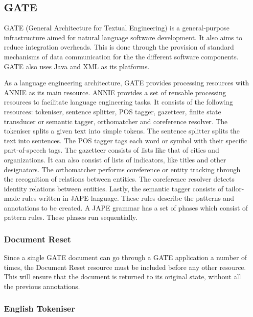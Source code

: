 \subsection{GATE}
\label{sec:gate}

GATE (General Architecture for Textual Engineering) is a general-purpose infrastructure aimed for natural language software development. It also aims to reduce integration overheads. This is done through the provision of standard mechanisms of data communication for the the different software components. GATE also uses Java and XML as its platforms. 

As a language engineering architecture, GATE provides processing resources with ANNIE as its main resource. ANNIE provides a set of reusable processing resources to facilitate language engineering tasks. It consists of the following resources: tokeniser, sentence splitter, POS tagger, gazetteer, finite state transducer or semantic tagger, orthomatcher and coreference resolver. The tokeniser splits a given text into simple tokens. The sentence splitter splits the text into sentences. The POS tagger tags each word or symbol with their specific part-of-speech tags. The gazetteer consists of lists like that of cities and organizations. It can also consist of lists of indicators, like titles and other designators. The orthomatcher performs coreference or entity tracking through the recognition of relations between entities. The coreference resolver detects identity relations between entities. Lastly, the semantic tagger consists of tailor-made rules written in JAPE language. These rules describe the patterns and annotations to be created. A JAPE grammar has a set of phases which consist of pattern rules. These phases run sequentially. 

\subsubsection{Document Reset}
\label{sec:docreset}

Since a single GATE document can go through a GATE application a number of times, the Document Reset resource must be included before any other resource. This will ensure that the document is returned to its original state, without all the previous annotations. 

\subsubsection{English Tokeniser}
\label{sec:tokeniser}

